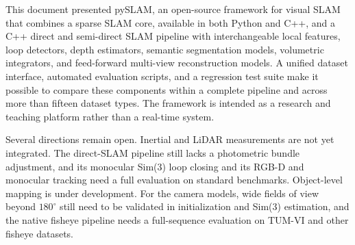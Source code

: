 \documentclass{article}
\begin{document}
This document presented pySLAM, an open-source framework for visual SLAM that combines a sparse SLAM core, available in both Python and C++, and a C++ direct and semi-direct SLAM pipeline with interchangeable local features, loop detectors, depth estimators, semantic segmentation models, volumetric integrators, and feed-forward multi-view reconstruction models. A unified dataset interface, automated evaluation scripts, and a regression test suite make it possible to compare these components within a complete pipeline and across more than fifteen dataset types. The framework is intended as a research and teaching platform rather than a real-time system.

Several directions remain open. Inertial and LiDAR measurements are not yet integrated. The direct-SLAM pipeline still lacks a photometric bundle adjustment, and its monocular Sim(3) loop closing and its RGB-D and monocular tracking need a full evaluation on standard benchmarks. Object-level mapping is under development. For the camera models, wide fields of view beyond $180^\circ$ still need to be validated in initialization and Sim(3) estimation, and the native fisheye pipeline needs a full-sequence evaluation on TUM-VI and other fisheye datasets.

%


\end{document}
